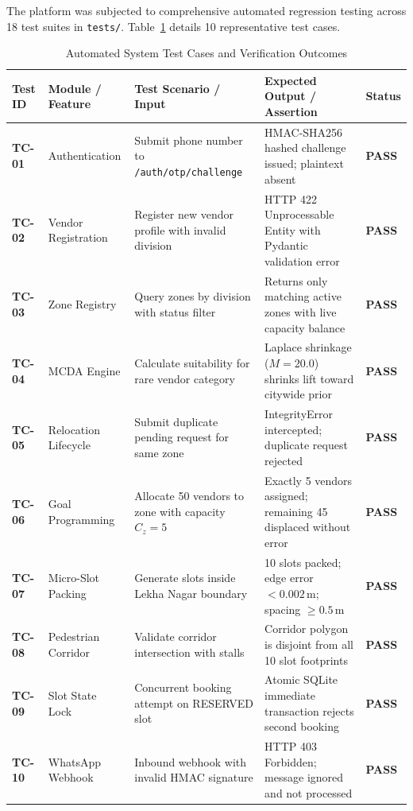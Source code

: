 The platform was subjected to comprehensive automated regression testing across 18 test suites in \texttt{tests/}. Table~\ref{tab:automated_test_cases} details 10 representative test cases.

\begin{table}[htbp]
\caption{Automated System Test Cases and Verification Outcomes}
\label{tab:automated_test_cases}
\centering
\scriptsize
\begin{tabularx}{\textwidth}{lp{}p{}p{}l}
\toprule
\textbf{Test ID} & \textbf{Module / Feature} & \textbf{Test Scenario / Input} & \textbf{Expected Output / Assertion} & \textbf{Status} \\
\midrule
\textbf{TC-01} & Authentication & Submit phone number to \texttt{/auth/otp/challenge} & HMAC-SHA256 hashed challenge issued; plaintext absent & \textbf{PASS} \\
\textbf{TC-02} & Vendor Registration & Register new vendor profile with invalid division & HTTP 422 Unprocessable Entity with Pydantic validation error & \textbf{PASS} \\
\textbf{TC-03} & Zone Registry & Query zones by division with status filter & Returns only matching active zones with live capacity balance & \textbf{PASS} \\
\textbf{TC-04} & MCDA Engine & Calculate suitability for rare vendor category & Laplace shrinkage ($M=20.0$) shrinks lift toward citywide prior & \textbf{PASS} \\
\textbf{TC-05} & Relocation Lifecycle & Submit duplicate pending request for same zone & IntegrityError intercepted; duplicate request rejected & \textbf{PASS} \\
\textbf{TC-06} & Goal Programming & Allocate 50 vendors to zone with capacity $C_z = 5$ & Exactly 5 vendors assigned; remaining 45 displaced without error & \textbf{PASS} \\
\textbf{TC-07} & Micro-Slot Packing & Generate slots inside Lekha Nagar boundary & 10 slots packed; edge error $< 0.002\,\text{m}$; spacing $\ge 0.5\,\text{m}$ & \textbf{PASS} \\
\textbf{TC-08} & Pedestrian Corridor & Validate corridor intersection with stalls & Corridor polygon is disjoint from all 10 slot footprints & \textbf{PASS} \\
\textbf{TC-09} & Slot State Lock & Concurrent booking attempt on RESERVED slot & Atomic SQLite immediate transaction rejects second booking & \textbf{PASS} \\
\textbf{TC-10} & WhatsApp Webhook & Inbound webhook with invalid HMAC signature & HTTP 403 Forbidden; message ignored and not processed & \textbf{PASS} \\
\bottomrule
\end{tabularx}
\end{table}

